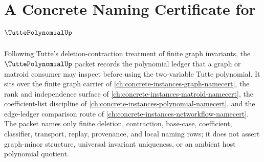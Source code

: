 \chapter{A Concrete Naming Certificate for $\TuttePolynomialUp$}
\label{ch:concrete-instances-tutte-polynomial-namecert}

Following Tutte's deletion-contraction treatment of finite graph invariants, the $\TuttePolynomialUp$ packet records the polynomial ledger that a graph or matroid consumer may inspect before using the two-variable Tutte polynomial. It sits over the finite graph carrier of \autoref{ch:concrete-instances-graph-namecert}, the rank and independence surface of \autoref{ch:concrete-instances-matroid-namecert}, the coefficient-list discipline of \autoref{ch:concrete-instances-polynomial-namecert}, and the edge-ledger comparison route of \autoref{ch:concrete-instances-networkflow-namecert}. The packet names only finite deletion, contraction, base-case, coefficient, classifier, transport, replay, provenance, and local naming rows; it does not assert graph-minor structure, universal invariant uniqueness, or an ambient host polynomial quotient.

